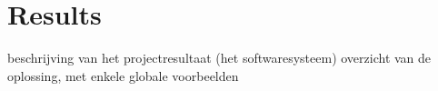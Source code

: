 
\section{Results}
beschrijving van het projectresultaat (het softwaresysteem)
overzicht van de oplossing, met enkele globale voorbeelden
